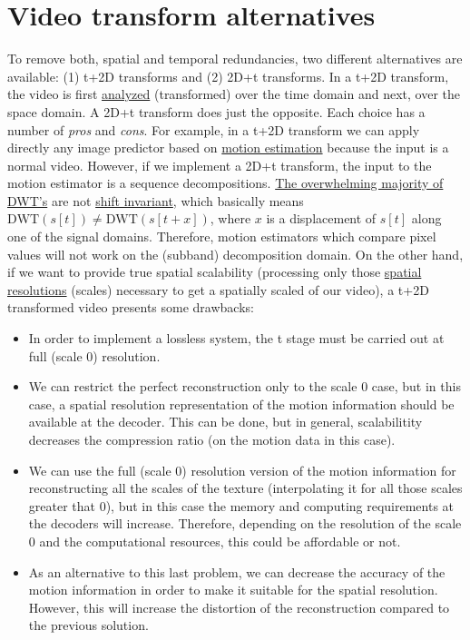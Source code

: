 \section{Video transform alternatives}
To remove both, spatial and temporal redundancies, two different
alternatives are available: (1) t+2D transforms and (2) 2D+t
transforms. In a t+2D transform, the video is first
\href{https://en.wikipedia.org/wiki/Digital_filter\#Analysis_techniques}{analyzed}
(transformed) over the time domain and next, over the space domain. A
2D+t transform does just the opposite. Each choice has a number of
\emph{pros} and \emph{cons}. For example, in a t+2D transform we can
apply directly any image predictor based on
\href{https://en.wikipedia.org/wiki/Motion_estimation}{motion
  estimation} because the input is a normal video. However, if we
implement a 2D+t transform, the input to the motion estimator is a
sequence decompositions.
\href{http://www.polyvalens.com/blog/wavelets/theory}{The overwhelming
  majority of DWT's} are not
\href{http://www.polyvalens.com/blog/wavelets/theory}{shift
  invariant}, which basically means $\text{DWT}(s[t]) \neq
\text{DWT}(s[t+x])$, where $x$ is a displacement of $s[t]$ along one of the
signal domains.  Therefore, motion estimators which compare pixel values
will not work on the (subband) decomposition domain. On the other
hand, if we want to provide true spatial scalability (processing only
those
\href{https://www.tutorialspoint.com/dip/spatial_resolution.htm}{spatial
  resolutions} (scales) necessary to get a spatially scaled of our
video), a t+2D transformed video presents some drawbacks:

\begin{itemize}
\item In order to implement a lossless system, the t stage must be
  carried out at full (scale 0) resolution.
\item We can restrict the perfect reconstruction only to the scale 0
  case, but in this case, a spatial resolution representation of the
  motion information should be available at the decoder. This can be
  done, but in general, scalabilitity decreases the compression ratio
  (on the motion data in this case).
\item We can use the full (scale 0) resolution version of the motion
  information for reconstructing all the scales of the texture
  (interpolating it for all those scales greater that 0), but in this
  case the memory and computing requirements at the decoders will
  increase. Therefore, depending on the resolution of the scale 0 and the
  computational resources, this could be affordable or not.
\item As an alternative to this last problem, we can decrease the
  accuracy of the motion information in order to make it suitable for
  the spatial resolution. However, this will increase the distortion
  of the reconstruction compared to the previous solution.
\end{itemize}

